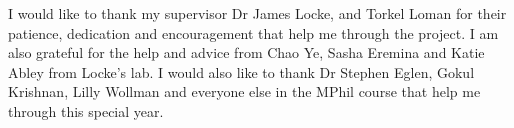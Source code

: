 
\begin{acknowledgements}      


I would like to thank my supervisor Dr James Locke, and 
Torkel Loman for their
patience, dedication and encouragement that help me through
the project.
I am also grateful for the help and advice from
Chao Ye, Sasha Eremina and Katie Abley from Locke's lab.
I would also like to thank Dr Stephen Eglen, 
Gokul Krishnan, Lilly Wollman and everyone else in the
MPhil course that help me through this special year.


\end{acknowledgements}
